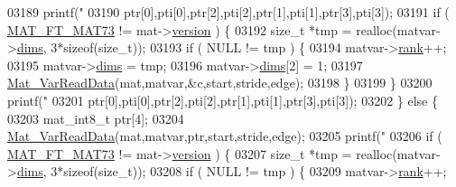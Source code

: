 \begin{DoxyCode}
{{{{{{{{{{{{{{{{{{{{{{{{{{{{{{{{{{{{{{{{{{{{{{{{{{{{03189                         printf(\textcolor{stringliteral}{"%
03190                             ptr[0],pti[0],ptr[2],pti[2],ptr[1],pti[1],ptr[3],pti[3]);
03191                         \textcolor{keywordflow}{if} ( \hyperlink{group___m_a_t_ggad03442b8378999189d510e3745c702b7a765c5d1d5038947646260dc82483517e}{MAT\_FT\_MAT73} != mat->\hyperlink{struct__mat__t_a729c2bc0afc97485057a5af425635b1a}{version} ) \{
03192                             \textcolor{keywordtype}{size\_t} *tmp = realloc(matvar->\hyperlink{group___m_a_t_a8e01234e1c862ce3472bb37f5a09b92c}{dims}, 3*\textcolor{keyword}{sizeof}(\textcolor{keywordtype}{size\_t}));
03193                             \textcolor{keywordflow}{if} ( NULL != tmp ) \{
03194                                 matvar->\hyperlink{group___m_a_t_a84ba70c96ded13cc555fa75b768d9921}{rank}++;
03195                                 matvar->\hyperlink{group___m_a_t_a8e01234e1c862ce3472bb37f5a09b92c}{dims} = tmp;
03196                                 matvar->\hyperlink{group___m_a_t_a8e01234e1c862ce3472bb37f5a09b92c}{dims}[2] = 1;
03197                                 \hyperlink{group___m_a_t_ga1845000f4fc6252ec5ff11c4b9f0759f}{Mat\_VarReadData}(mat,matvar,&c,start,stride,edge);
03198                             \}
03199                         \}
03200                         printf(\textcolor{stringliteral}{"%
03201                             ptr[0],pti[0],ptr[2],pti[2],ptr[1],pti[1],ptr[3],pti[3]);
03202                     \} \textcolor{keywordflow}{else} \{
03203                         mat\_int8\_t ptr[4];
03204                         \hyperlink{group___m_a_t_ga1845000f4fc6252ec5ff11c4b9f0759f}{Mat\_VarReadData}(mat,matvar,ptr,start,stride,edge);
03205                         printf(\textcolor{stringliteral}{"%
03206                         \textcolor{keywordflow}{if} ( \hyperlink{group___m_a_t_ggad03442b8378999189d510e3745c702b7a765c5d1d5038947646260dc82483517e}{MAT\_FT\_MAT73} != mat->\hyperlink{struct__mat__t_a729c2bc0afc97485057a5af425635b1a}{version} ) \{
03207                             \textcolor{keywordtype}{size\_t} *tmp = realloc(matvar->\hyperlink{group___m_a_t_a8e01234e1c862ce3472bb37f5a09b92c}{dims}, 3*\textcolor{keyword}{sizeof}(\textcolor{keywordtype}{size\_t}));
03208                             \textcolor{keywordflow}{if} ( NULL != tmp ) \{
03209                                 matvar->\hyperlink{group___m_a_t_a84ba70c96ded13cc555fa75b768d9921}{rank}++;
}}}}}}}}}}}}}}}}}}}}}}}}}}}}}}}}}}}}}}}}}}}}}}}}}}}}}}}
\end{DoxyCode}
